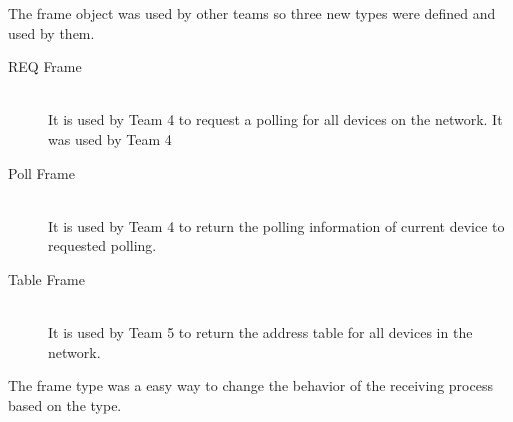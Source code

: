 The frame object was used by other teams so three new types were defined and used by them.
\begin{description}
  \item[REQ Frame] \hfill \\
It is used by Team 4 to request a polling for all devices on the network. It was used by Team 4
	
  \item[Poll Frame] \hfill \\
 It is used by Team 4 to return the polling information of current device to requested polling. 
  \item[Table Frame] \hfill \\
 It is used by Team 5 to return the address table for all devices in the network.

\end{description} 

The frame type was a easy way to change the behavior of the receiving process based on the type.  


